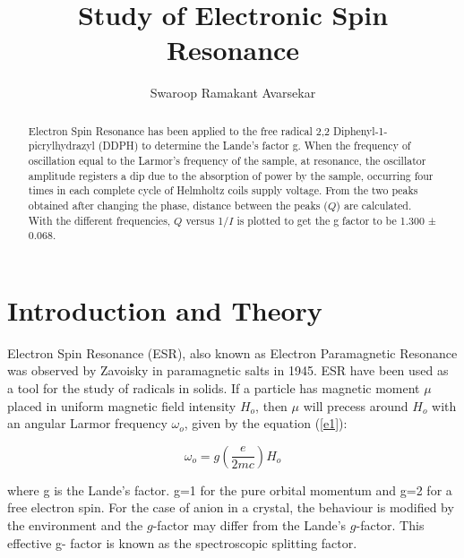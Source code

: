\documentclass[a4paper, amsfonts, amssymb, amsmath, reprint, showkeys, nofootinbib, twoside]{revtex4-1}
\begin{document}
\title{Study of Electronic Spin Resonance}
\author{Swaroop Ramakant Avarsekar}

	
\begin{abstract}
Electron Spin Resonance has been applied to the free radical 2,2 Diphenyl-1- picrylhydrazyl (DDPH) to determine the Lande's factor g. When the frequency of oscillation equal to the Larmor’s frequency of the sample, at resonance, the oscillator amplitude registers a dip due to the absorption of power by the sample, occurring four times in each complete cycle of Helmholtz coils supply voltage. From the two peaks obtained after changing the phase, distance between the peaks ($Q$) are calculated. With the different frequencies, $Q$ versus 1/$I$ is plotted to get the g factor to be 1.300 ± 0.068. 
\end{abstract}
	
	
\maketitle

\section{Introduction and Theory}
Electron Spin Resonance (ESR), also known as Electron Paramagnetic Resonance was  observed by Zavoisky in paramagnetic salts in 1945. ESR have been used as a tool for the study of radicals in solids. If a particle has magnetic moment $\mu$ placed in uniform magnetic field intensity $H_o$, then $\mu$ will precess around $H_o$ with an angular Larmor frequency $\omega_o$, given by the equation (\ref{e1}):

\begin{equation}\label{e1}
\omega_o=g\left(\frac{e}{2mc}\right)H_o
\end{equation}

where g is the Lande's factor. g=1 for the pure orbital momentum and g=2 for a free electron spin. For the case of anion in a crystal, the behaviour is modified by the environment and the $g$-factor may differ from the Lande's $g$-factor. This effective g- factor is known as the spectroscopic splitting factor. 
\end{document}
